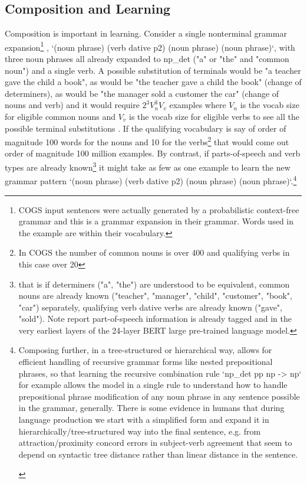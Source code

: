 \documentclass[11pt]{article}
\begin{document}
\subsection{Composition and Learning}
\label{composition_and_learning}
Composition is important in learning. Consider a single nonterminal grammar expansion\footnote{COGS input sentences were actually generated by a probabilistic context-free grammar and this is a grammar expansion in their grammar. Words used in the example are within their vocabulary.} , `(noun phrase) (verb dative p2) (noun phrase) (noun phrase)`, with three noun phrases all already expanded to np\_det ("a" or "the" and "common noun") and a single verb. A possible substitution of terminals would be "a teacher gave the child a book", as would be "the teacher gave a child the book" (change of determiners), as would be "the manager sold a customer the car" (change of nouns and verb) and it would require $2^3 V_n^3V_v $ examples where $V_n$ is the vocab size for eligible common nouns and $V_v$ is the vocab size for eligible verbs to see all the possible terminal substitutions . If the qualifying vocabulary is say of order of magnitude 100 words for the nouns and 10 for the verbs\footnote{In COGS the number of common nouns is over 400 and qualifying verbs in this case over 20} that would come out order of magnitude 100 million examples. By contrast, if parts-of-speech and verb types are already known\footnote{that is if determiners ("a", "the") are understood to be equivalent, common nouns are already known ("teacher", "manager", "child", "customer", "book", "car") separately, qualifying verb dative verbs are already known ("gave", "sold"). Note \cite{tenney2019bertrediscoversclassicalnlp} report part-of-speech information is already tagged and in the very earliest layers of the 24-layer BERT large pre-trained language model.} it might take as few as one example to learn the new grammar pattern `(noun phrase) (verb dative p2) (noun phrase) (noun phrase)`.\footnote{\begin{footnotesize}Composing further, in a tree-structured or hierarchical way, allows for efficient handling of recursive grammar forms like nested prepositional phrases, so that learning the recursive combination rule `np\_det pp np -> np` for example allows the model in a single rule to understand how to handle prepositional phrase modification of any noun phrase in any sentence possible in the grammar, generally. 
There is some evidence in humans that during language production we start with a simplified form and expand it in hierarchically/tree-structured way into the final sentence, e.g. from attraction/proximity concord errors in subject-verb agreement that seem to depend on syntactic tree distance rather than linear distance in the sentence\cite{FRANCK2006173}\cite{VIGLIOCCO1998B13}.

\end{footnotesize}}
\end{document}
